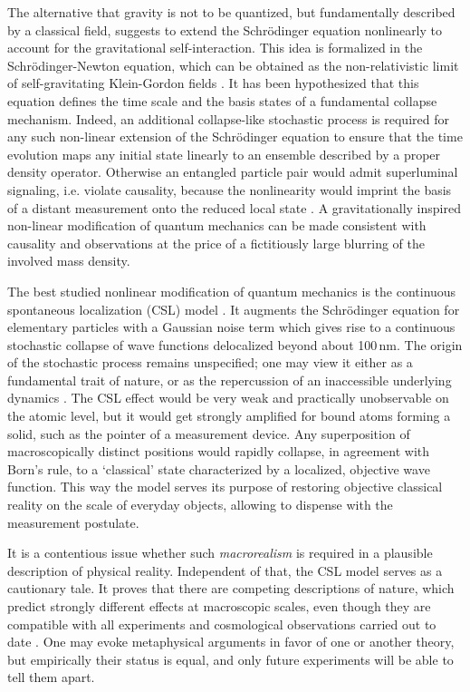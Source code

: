 \documentclass[11pt]{article}
\begin{document}
The alternative that gravity is not to be quantized, but fundamentally described by a classical field, suggests to extend the Schr\"odinger equation nonlinearly to account for the gravitational self-interaction\cite{Bassi2012,PhysRevLett.110.170401}.
This idea is formalized in the Schr\"odinger-Newton equation, which can be obtained as the non-relativistic limit of self-gravitating Klein-Gordon fields \cite{Giulini2012}. 
It has been hypothesized that this equation defines the time scale and the basis states of a fundamental collapse mechanism. 
Indeed, an additional collapse-like stochastic process is required for any such non-linear extension of the Schr\"odinger equation to ensure that the time evolution maps any initial state linearly to an ensemble described by a proper density operator. Otherwise an entangled particle pair  would admit superluminal signaling, i.e. violate causality, because the nonlinearity would imprint the basis of a distant measurement onto the reduced local state \cite{gisin1989stochastic}. A gravitationally inspired non-linear modification of quantum mechanics\cite{diosi1987universal} can be made consistent with causality and observations at the price of a fictitiously large blurring of the involved mass density\cite{Bassi2012}.

The best studied nonlinear modification of quantum mechanics is the continuous spontaneous localization (CSL) model \cite{GPR1990,Bassi2003}. It augments the Schr\"odinger equation for elementary particles with a Gaussian noise term which gives rise to a continuous stochastic collapse of wave functions delocalized beyond about 100\,nm.
The origin of the stochastic process remains unspecified; one may view it either as a fundamental trait of nature, or as the repercussion of an inaccessible underlying dynamics
\cite{Adler2004}.
The CSL effect would be very weak and practically unobservable on the atomic level, but
it would get strongly amplified 
for bound atoms forming a solid, such as the pointer of a measurement device. Any superposition of macroscopically distinct positions would rapidly collapse, in agreement with Born's rule, to a `classical' state characterized by a localized, objective wave function.
This way the model serves its purpose of restoring objective classical reality on the scale of everyday objects,
allowing to dispense with the measurement postulate.

It is a contentious issue whether  such \emph{macrorealism} \cite{Leggett2002} is required in a plausible description of physical reality. Independent of that,  the CSL model 
serves as a cautionary tale.
It proves that there are competing descriptions of nature,
which predict strongly different effects at macroscopic scales, 
even though they are compatible with all experiments and cosmological observations carried out to date \cite{Feldmann2012,Bassi2012}. One may evoke metaphysical arguments in favor of one or another theory, but empirically their status is equal, and only future experiments will be able to tell them apart.
\end{document}
